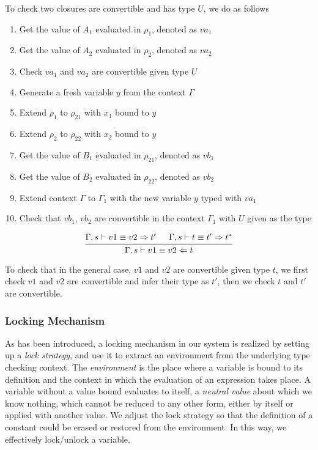 \documentclass{article}
\theoremstyle{remark}
\begin{document}
To check two closures are convertible and has type $U$, we do as follows
\begin{enumerate}
\item Get the value of $A_1$ evaluated in $\rho_1$, denoted as $va_1$
\item Get the value of $A_2$ evaluated in $\rho_2$, denoted as $va_2$
\item Check $va_1$ and $va_2$ are convertible given type $U$
\item Generate a fresh variable $y$ from the context $\Gamma$
\item Extend $\rho_1$ to $\rho_{21}$ with $x_1$ bound to $y$ 
\item Extend $\rho_2$ to $\rho_{22}$ with $x_2$ bound to $y$ 
\item Get the value of $B_1$ evaluated in $\rho_{21}$, denoted as $vb_1$
\item Get the value of $B_2$ evaluated in $\rho_{22}$, denoted as $vb_2$
\item Extend context $\Gamma$ to $\Gamma_1$ with the new variable $y$ typed with $va_1$
\item Check that $vb_1$, $vb_2$ are convertible in the context $\Gamma_1$ with $U$ given as the type
\end{enumerate}

\begin{align}
  \begin{prooftree}
    \hypo{\Gamma,s \vdash v1 \equiv v2 \Rightarrow t'}
    \hypo{\Gamma,s \vdash t \equiv t' \Rightarrow t^*}
    \infer2{\Gamma,s \vdash v1 \equiv v2 \Leftarrow t} 
  \end{prooftree}
\end{align}

To check that in the general case, $v1$ and $v2$ are convertible given type $t$, we first check $v1$ and $v2$ are convertible and infer their type as $t'$, then we check $t$ and $t'$ are convertible.

\subsubsection{Locking Mechanism}
As has been introduced, a locking mechanism in our system is realized by setting up a \emph{lock strategy}, and use it to extract an environment from the underlying type checking context. The \emph{environment} is the place where a variable is bound to its definition and the context in which the evaluation of an expression takes place. A variable without a value bound evaluates to itself, a \emph{neutral value} about which we know nothing, which cannot be reduced to any other form, either by itself or applied with another value. We adjust the lock strategy so that the definition of a constant could be erased or restored from the environment. In this way, we effectively lock/unlock a variable.
\end{document}
